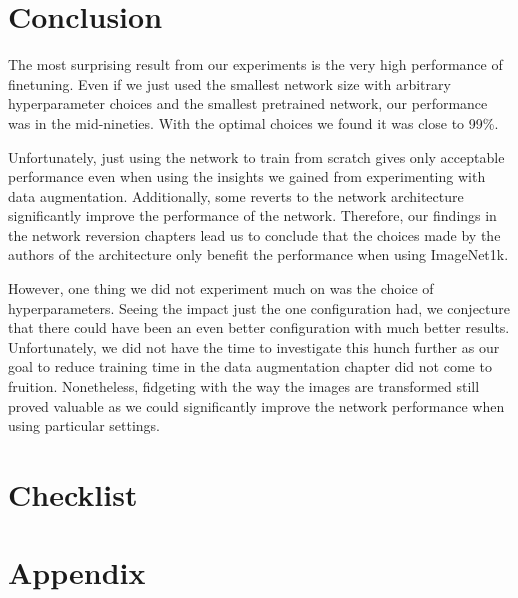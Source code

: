 \documentclass{article}
\begin{document}
\section{Conclusion}\label{sec:conclusion}
The most surprising result from our experiments is the very high performance of finetuning.
Even if we just used the smallest network size with arbitrary hyperparameter choices and the smallest pretrained network, our performance was in the mid-nineties.
With the optimal choices we found it was close to 99\%.

Unfortunately, just using the network to train from scratch gives only acceptable performance even when using the insights we gained from experimenting with data augmentation.
Additionally, some reverts to the network architecture significantly improve the performance of the network.
Therefore, our findings in the network reversion chapters lead us to conclude that the choices made by the authors of the architecture only benefit the performance when using ImageNet1k.

However, one thing we did not experiment much on was the choice of hyperparameters.
Seeing the impact just the one configuration had, we conjecture that there could have been an even better configuration with much better results.
Unfortunately, we did not have the time to investigate this hunch further as our goal to reduce training time in the data augmentation chapter did not come to fruition.
Nonetheless, fidgeting with the way the images are transformed still proved valuable as we could significantly improve the network performance when using particular settings.
\printbibliography
\section*{Checklist}

\appendix
\section{Appendix}\label{sec:appendix}
\end{document}
